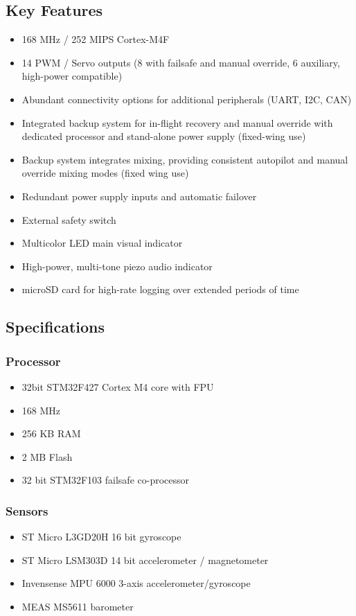 \subsection{Key Features}
\begin{itemize}
\item 168 MHz / 252 MIPS Cortex-M4F
\item 14 PWM / Servo outputs (8 with failsafe and manual override, 6 auxiliary, high-power compatible)
\item Abundant connectivity options for additional peripherals (UART, I2C, CAN)
\item Integrated backup system for in-flight recovery and manual override with dedicated processor and stand-alone power supply (fixed-wing use)
\item Backup system integrates mixing, providing consistent autopilot and manual override mixing modes (fixed wing use)
\item Redundant power supply inputs and automatic failover
\item External safety switch
\item Multicolor LED main visual indicator
\item High-power, multi-tone piezo audio indicator
\item microSD card for high-rate logging over extended periods of time
\end{itemize}

\subsection{Specifications}
\subsubsection{Processor}
\begin{itemize}
\item 32bit STM32F427 Cortex M4 core with FPU
\item 168 MHz
\item 256 KB RAM
\item 2 MB Flash
\item 32 bit STM32F103 failsafe co-processor
\end{itemize}
\subsubsection{Sensors}
\begin{itemize}
\item ST Micro L3GD20H 16 bit gyroscope
\item ST Micro LSM303D 14 bit accelerometer / magnetometer
\item Invensense MPU 6000 3-axis accelerometer/gyroscope
\item MEAS MS5611 barometer
\end{itemize}

